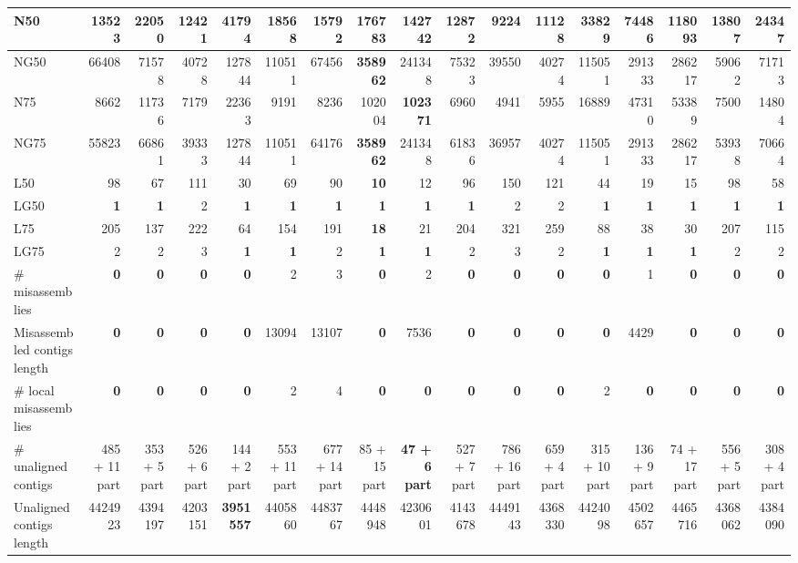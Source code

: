 \documentclass[12pt,a4paper]{article}
\begin{document}
\begin{table}[ht]
\begin{center}
\begin{tabular}{|l*{16}{|r}|}
N50 & 13523 & 22050 & 12421 & 41794 & 18568 & 15792 & {\bf 176783} & 142742 & 12872 & 9224 & 11128 & 33829 & 74486 & 118093 & 13807 & 24347 \\ \hline
NG50 & 66408 & 71578 & 40728 & 127844 & 110511 & 67456 & {\bf 358962} & 241348 & 75323 & 39550 & 40274 & 115051 & 291333 & 286217 & 59062 & 71713 \\ \hline
N75 & 8662 & 11736 & 7179 & 22363 & 9191 & 8236 & 102004 & {\bf 102371} & 6960 & 4941 & 5955 & 16889 & 47310 & 53389 & 7500 & 14804 \\ \hline
NG75 & 55823 & 66861 & 39333 & 127844 & 110511 & 64176 & {\bf 358962} & 241348 & 61836 & 36957 & 40274 & 115051 & 291333 & 286217 & 53938 & 70664 \\ \hline
L50 & 98 & 67 & 111 & 30 & 69 & 90 & {\bf 10} & 12 & 96 & 150 & 121 & 44 & 19 & 15 & 98 & 58 \\ \hline
LG50 & {\bf 1} & {\bf 1} & 2 & {\bf 1} & {\bf 1} & {\bf 1} & {\bf 1} & {\bf 1} & {\bf 1} & 2 & 2 & {\bf 1} & {\bf 1} & {\bf 1} & {\bf 1} & {\bf 1} \\ \hline
L75 & 205 & 137 & 222 & 64 & 154 & 191 & {\bf 18} & 21 & 204 & 321 & 259 & 88 & 38 & 30 & 207 & 115 \\ \hline
LG75 & 2 & 2 & 3 & {\bf 1} & {\bf 1} & 2 & {\bf 1} & {\bf 1} & 2 & 3 & 2 & {\bf 1} & {\bf 1} & {\bf 1} & 2 & 2 \\ \hline
\# misassemblies & {\bf 0} & {\bf 0} & {\bf 0} & {\bf 0} & 2 & 3 & {\bf 0} & 2 & {\bf 0} & {\bf 0} & {\bf 0} & {\bf 0} & 1 & {\bf 0} & {\bf 0} & {\bf 0} \\ \hline
Misassembled contigs length & {\bf 0} & {\bf 0} & {\bf 0} & {\bf 0} & 13094 & 13107 & {\bf 0} & 7536 & {\bf 0} & {\bf 0} & {\bf 0} & {\bf 0} & 4429 & {\bf 0} & {\bf 0} & {\bf 0} \\ \hline
\# local misassemblies & {\bf 0} & {\bf 0} & {\bf 0} & {\bf 0} & 2 & 4 & {\bf 0} & {\bf 0} & {\bf 0} & {\bf 0} & {\bf 0} & 2 & {\bf 0} & {\bf 0} & {\bf 0} & {\bf 0} \\ \hline
\# unaligned contigs & 485 + 11 part & 353 + 5 part & 526 + 6 part & 144 + 2 part & 553 + 11 part & 677 + 14 part & 85 + 15 part & {\bf 47 + 6 part} & 527 + 7 part & 786 + 16 part & 659 + 4 part & 315 + 10 part & 136 + 9 part & 74 + 17 part & 556 + 5 part & 308 + 4 part \\ \hline
Unaligned contigs length & 4424923 & 4394197 & 4203151 & {\bf 3951557} & 4405860 & 4483767 & 4448948 & 4230601 & 4143678 & 4449143 & 4368330 & 4424098 & 4502657 & 4465716 & 4368062 & 4384090 \\ \hline

\end{tabular}
\end{center}
\end{table}
\end{document}
